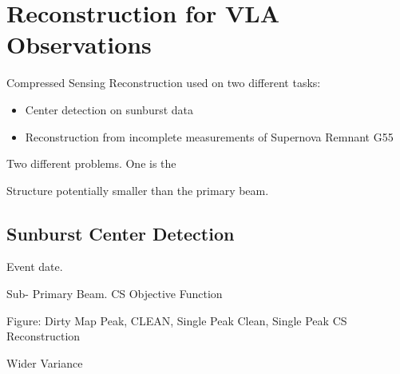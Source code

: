 \section{Reconstruction for VLA Observations}

Compressed Sensing Reconstruction used on two different tasks:
\begin{itemize}
	\item Center detection on sunburst data
	\item Reconstruction from incomplete measurements of Supernova Remnant G55
\end{itemize}

Two different problems. One is the 

Structure potentially smaller than the primary beam.



\subsection{Sunburst Center Detection}

Event date.

Sub- Primary Beam.
CS Objective Function

Figure: Dirty Map Peak, CLEAN, Single Peak Clean, Single Peak CS Reconstruction

\begin{figure}
	
\end{figure}

Wider Variance




